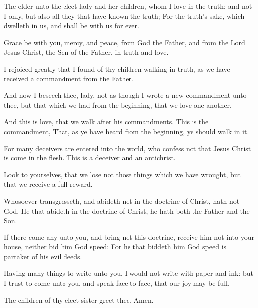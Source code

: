 \Chapter
\Verse The elder unto the elect lady and her children, whom I love in the truth; and not I only, but also all they that have known the truth; \Verse For the truth's sake, which dwelleth in us, and shall be with us for ever.

\Verse Grace be with you, mercy, and peace, from God the Father, and from the Lord Jesus Christ, the Son of the Father, in truth and love.

\Verse I rejoiced greatly that I found of thy children walking in truth, as we have received a commandment from the Father.

\Verse And now I beseech thee, lady, not as though I wrote a new commandment unto thee, but that which we had from the beginning, that we love one another.

\Verse And this is love, that we walk after his commandments. This is the commandment, That, as ye have heard from the beginning, ye should walk in it.

\Verse For many deceivers are entered into the world, who confess not that Jesus Christ is come in the flesh. This is a deceiver and an antichrist.

\Verse Look to yourselves, that we lose not those things which we have wrought, but that we receive a full reward.

\Verse Whosoever transgresseth, and abideth not in the doctrine of Christ, hath not God. He that abideth in the doctrine of Christ, he hath both the Father and the Son.

\Verse If there come any unto you, and bring not this doctrine, receive him not into your house, neither bid him God speed: \Verse For he that biddeth him God speed is partaker of his evil deeds.

\Verse Having many things to write unto you, I would not write with paper and ink: but I trust to come unto you, and speak face to face, that our joy may be full.

\Verse The children of thy elect sister greet thee. Amen.


